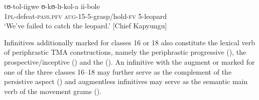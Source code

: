 \begin{exe}
\ex \label{exToligwa}
\gll tʊ-tol-iigwe ʊ-kʊ-lɪ-kol-a ii-bole\\
\textsc{1pl}-defeat-\textsc{pass.pfv} \textsc{aug}-15-5-grasp/hold-\textsc{fv} 5-leopard\\
\glt `We've failed to catch the leopard.' [Chief Kapyungu]
\end{exe}

Infinitives additionally marked for  classes 16 or 18 also constitute the lexical verb of periphrastic TMA constructions, namely the periphrastic progressive (), the prospective/inceptive () and the  (). An infinitive with the augment or marked for one of the three  classes 16--18 may further serve as the complement of the persistive aspect  () and augmentless infinitives may serve as the semantic main verb of the movement grams ().

